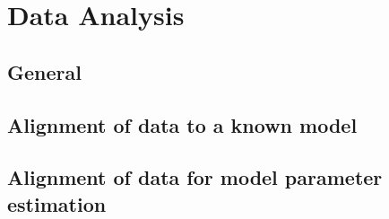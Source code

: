 \chapter{Data Analysis}
\label{data_analysis}

\section{General}

\section{Alignment of data to a known model}

\section{Alignment of data for model parameter estimation}